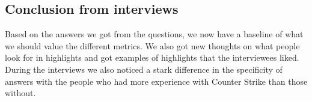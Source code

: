 \subsection{Conclusion from interviews}
Based on the answers we got from the questions, we now have a baseline of what we should value the different metrics. We also got new thoughts on what people look for in highlights and got examples of highlights that the interviewees liked. During the interviews we also noticed a stark difference in the specificity of answers with the people who had more experience with Counter Strike than those without. 

